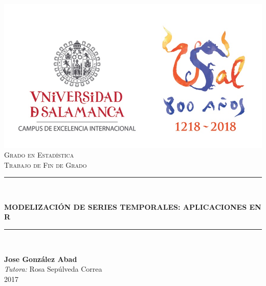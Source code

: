 \documentclass[12pt,a4paper,twoside]{article}
\begin{document}
\begin{titlepage}

\newcommand{\HRule}{\rule{\linewidth}{0.5Mm}}

\center


\includegraphics{Logo-USAL.jpg}\\[1.5cm]
\textsc{\large Grado en Estadística}\\[0.5cm] 
\textsc{\LARGE Trabajo de Fin de Grado}\\[1.5cm] 



\HRule \\[1cm]
 \begin{spacing}{1}
 \huge \bfseries MODELIZACIÓN DE SERIES TEMPORALES: APLICACIONES EN R \\[0.4cm] 
\HRule \\[1cm]
\end{spacing}

\singlespacing



\Large \textbf{Jose González Abad} \\[2.5cm]

\large \emph{Tutora:} Rosa Sepúlveda Correa \\[1.5cm]



{\large 2017}\\[2cm] 


\vfill %

\end{titlepage}
\end{document}
